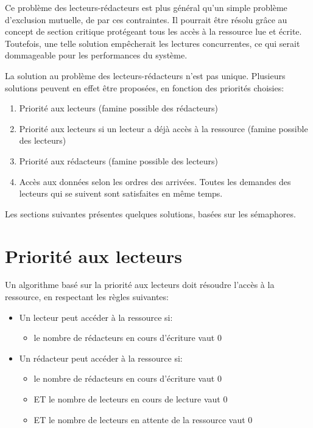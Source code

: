 Ce problème des lecteurs-rédacteurs est plus général qu'un simple problème d'exclusion mutuelle, de par ces contraintes.
Il pourrait être résolu grâce au concept de section critique protégeant tous les accès à la ressource lue et écrite. Toutefois, une telle solution empêcherait les lectures concurrentes, ce qui serait dommageable pour les performances du système.

La solution au problème des lecteurs-rédacteurs n'est pas unique. Plusieurs solutions peuvent en effet être proposées, en fonction des priorités choisies:

\begin{enumerate}
  \item Priorité aux lecteurs (famine possible des rédacteurs)
  \item Priorité aux lecteurs si un lecteur a déjà accès à la ressource (famine possible des lecteurs)
  \item  Priorité aux rédacteurs (famine possible des lecteurs)
  \item Accès aux données selon les ordres des arrivées. Toutes les demandes des lecteurs qui se suivent sont satisfaites en même temps.
\end{enumerate}

Les sections suivantes présentes quelques solutions, basées sur les sémaphores.

\section{Priorité aux lecteurs}

Un algorithme basé sur la priorité aux lecteurs doit résoudre l'accès à la ressource, en respectant les règles suivantes:
\begin{itemize}
  \item Un lecteur peut accéder à la ressource si:
        \begin{itemize}
          \item le nombre de rédacteurs en cours d'écriture vaut 0
        \end{itemize}
  \item Un rédacteur peut accéder à la ressource si:
        \begin{itemize}
          \item le nombre de rédacteurs en cours d'écriture vaut 0
          \item ET le nombre de lecteurs en cours de lecture vaut 0
          \item ET le nombre de lecteurs en attente de la ressource vaut 0
        \end{itemize}
\end{itemize}

